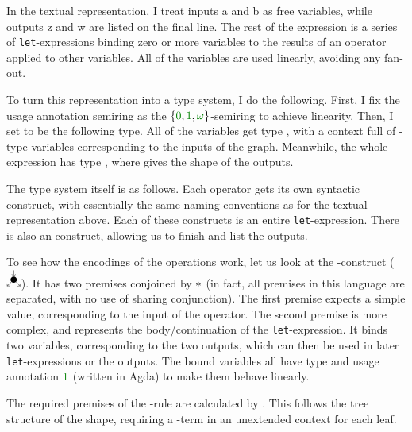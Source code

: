In the textual representation, I treat inputs a and b as free variables, while
outputs z and w are listed on the final line.
The rest of the expression is a series of \texttt{let}-expressions binding zero
or more variables to the results of an operator applied to other variables.
All of the variables are used linearly, avoiding any fan-out.

To turn this representation into a type system, I do the following.
First, I fix the usage annotation semiring as the
$\{\gr0, \gr1, \gr\omega\}$-semiring to achieve linearity.
Then, I set  to be the following type.
All of the variables get type , with a context
full of -type variables corresponding to the
inputs of the graph.
Meanwhile, the whole expression has type
\AgdaSpace{}, where 
gives the shape of the outputs.


The type system itself is as follows.
Each operator gets its own syntactic construct, with essentially the same naming
conventions as for the textual representation above.
Each of these constructs is an entire \texttt{let}-expression.
There is also an  construct, allowing us to
finish and list the outputs.

To see how the encodings of the operations work, let us look at the
-construct
($\tikz{\node (n) [circle,fill,minimum size=2mm,inner sep=0] {};%
  \draw[->] (n) to (2.12mm,-2.12mm); \draw[->] (n) to (-2.12mm,-2.12mm);%
  \draw[->] (0,3mm) to (n)}$).
It has two premises conjoined by $\mathbin{*}$ (in fact, all premises in this language
are separated, with no use of sharing conjunction).
The first premise expects a simple value, corresponding to the input of the
operator.
The second premise is more complex, and represents the body/continuation of the
\texttt{let}-expression.
It binds two variables, corresponding to the two outputs, which can then be used
in later \texttt{let}-expressions or the outputs.
The bound variables all have type  and usage
annotation $\gr1$ (written  in Agda) to make them
behave linearly.


The required premises of the -rule are calculated
by .
This follows the tree structure of the shape, requiring a
-term in an unextended context for each leaf.

